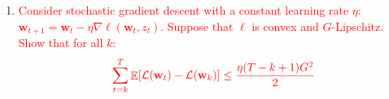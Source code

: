 \documentclass[letterpaper]{article}
\newcommand{\E}{\mathop{\mathbb{E}}}
\renewcommand{\L}{\mathcal{L}}
\newcommand{\bw}{\mathbf{w}}
\newcommand{\addspace}{\vskip1.5em}
\newcommand{\refequ}[1]{Eqn.~\eqref{#1}}
\begin{document}
\begin{enumerate}
%    
%    
%    
%    
%    

    
    \setcounter{equation}{0}
    \item \textcolor{red}{Consider stochastic gradient descent with a constant learning rate $\eta$: $\bw_{t+1} = \bw_t - \eta \nabla \ell(\bw_t, z_t)$. Suppose that $\ell$ is convex and $G$-Lipschitz. Show that for all $k$:}
    \begin{align*}
        \textcolor{red}{\sum_{t=k}^T \E[\L(\bw_t) - \L(\bw_{k})]\le \frac{\eta (T-k + 1)G^2}{2}}
    \end{align*}
    

\end{enumerate}
\end{document}

